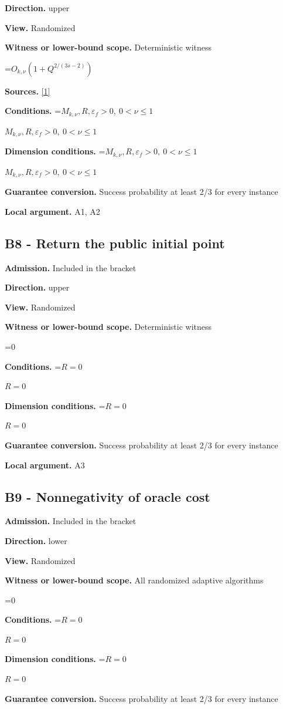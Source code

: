 \documentclass[10pt,a4paper]{article}
\newcommand{\AtlasMath}[1]{\par\begingroup\centering\setbox0=\hbox{$\displaystyle #1$}\ifdim\wd0>1.4\linewidth\typeout{ATLAS WIDE FORMULA: \the\wd0}\fi\ifdim\wd0>\linewidth\resizebox{\linewidth}{!}{\box0}\else\box0\fi\par\endgroup}
\newcommand{\AtlasInlineMath}[1]{\begingroup\setbox0=\hbox{$#1$}\ifdim\wd0>.4\linewidth\endgroup\AtlasMath{#1}\else\endgroup$#1$\fi}
\begin{document}
\textbf{Direction.} upper

\textbf{View.} Randomized

\textbf{Witness or lower-bound scope.} Deterministic witness

\AtlasMath{O_{k,\nu}(1+Q^{2/(3s-2)})}
\textbf{Sources.} \href{https://arxiv.org/pdf/2411.08987v2}{[1]}

\textbf{Conditions.} \AtlasInlineMath{M_{k,\nu},R,\varepsilon_f>0,\ 0<\nu\le1}

\textbf{Dimension conditions.} \AtlasInlineMath{M_{k,\nu},R,\varepsilon_f>0,\ 0<\nu\le1}

\textbf{Guarantee conversion.} Success probability at least 2/3 for every instance

\textbf{Local argument.} A1, A2

\subsection{B8 - Return the public initial point}
\textbf{Admission.} Included in the bracket

\textbf{Direction.} upper

\textbf{View.} Randomized

\textbf{Witness or lower-bound scope.} Deterministic witness

\AtlasMath{0}
\textbf{Conditions.} \AtlasInlineMath{R=0}

\textbf{Dimension conditions.} \AtlasInlineMath{R=0}

\textbf{Guarantee conversion.} Success probability at least 2/3 for every instance

\textbf{Local argument.} A3

\subsection{B9 - Nonnegativity of oracle cost}
\textbf{Admission.} Included in the bracket

\textbf{Direction.} lower

\textbf{View.} Randomized

\textbf{Witness or lower-bound scope.} All randomized adaptive algorithms

\AtlasMath{0}
\textbf{Conditions.} \AtlasInlineMath{R=0}

\textbf{Dimension conditions.} \AtlasInlineMath{R=0}

\textbf{Guarantee conversion.} Success probability at least 2/3 for every instance
\end{document}
